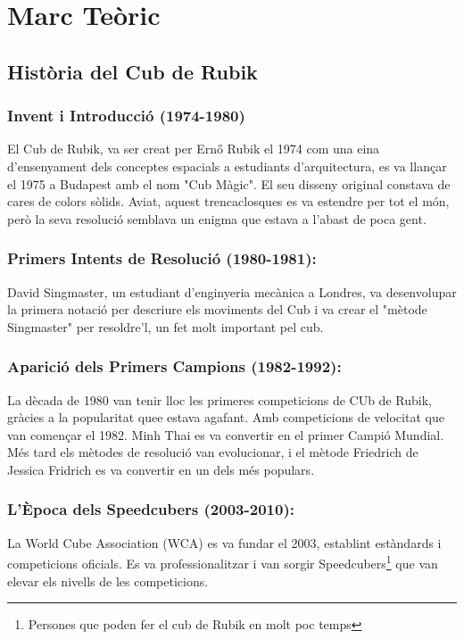 \section{Marc Teòric}
\subsection{Història del Cub de Rubik}

\subsubsection{Invent i Introducció (1974-1980)}

El Cub de Rubik, va ser creat per Ernő Rubik el 1974 com una eina d'ensenyament dels conceptes espacials a estudiants d'arquitectura, es va llançar el 1975 a Budapest amb el nom "Cub Màgic". El seu disseny original constava de cares de colors sòlids. Aviat, aquest trencaclosques es va estendre per tot el món, però la seva resolució semblava un enigma que estava a l'abast de poca gent.

\subsubsection{Primers Intents de Resolució (1980-1981):}

David Singmaster, un estudiant d'enginyeria mecànica a Londres, va desenvolupar la primera notació per descriure els moviments del Cub i va crear el "mètode Singmaster" per resoldre'l, un fet molt important pel cub.

\subsubsection{Aparició dels Primers Campions (1982-1992):}

La dècada de 1980 van tenir lloc les primeres competicions de CUb de Rubik, gràcies a la popularitat quee estava agafant. Amb competicions de velocitat que van començar el 1982. Minh Thai es va convertir en el primer Campió Mundial. Més tard els mètodes de resolució van evolucionar, i el mètode Friedrich de Jessica Fridrich es va convertir en un dels més populars.

\subsubsection{L'Època dels Speedcubers (2003-2010):}

La World Cube Association (WCA) es va fundar el 2003, establint estàndards i competicions oficials. Es va professionalitzar i van sorgir Speedcubers\footnote{Persones que poden fer el cub de Rubik en molt poc temps} que van elevar els nivells de les competicions.

